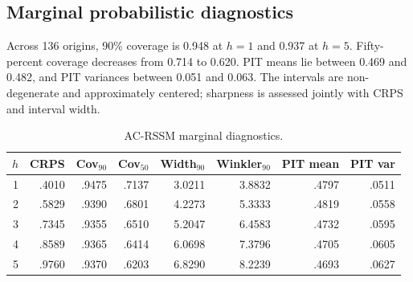 \documentclass[11pt]{article}
\begin{document}
\subsection{Marginal probabilistic diagnostics}
Across 136 origins, 90\% coverage is 0.948 at $h=1$ and 0.937 at $h=5$. Fifty-percent coverage decreases from 0.714 to 0.620. PIT means lie between 0.469 and 0.482, and PIT variances between 0.051 and 0.063. The intervals are non-degenerate and approximately centered; sharpness is assessed jointly with CRPS and interval width.
\begin{table}[h]\centering\caption{AC-RSSM marginal diagnostics.}\begin{tabular}{rrrrrrrr}\toprule $h$ & CRPS & Cov$_{90}$ & Cov$_{50}$ & Width$_{90}$ & Winkler$_{90}$ & PIT mean & PIT var\\\midrule 1 & .4010 & .9475 & .7137 & 3.0211 & 3.8832 & .4797 & .0511\\ 2 & .5829 & .9390 & .6801 & 4.2273 & 5.3333 & .4819 & .0558\\ 3 & .7345 & .9355 & .6510 & 5.2047 & 6.4583 & .4732 & .0595\\ 4 & .8589 & .9365 & .6414 & 6.0698 & 7.3796 & .4705 & .0605\\ 5 & .9760 & .9370 & .6203 & 6.8290 & 8.2239 & .4693 & .0627\\\bottomrule\end{tabular}\end{table}
\end{document}
